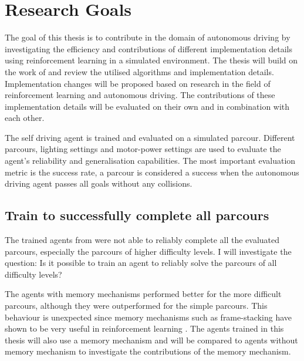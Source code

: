 


\chapter{Research Goals}
\label{cha:Research Goals}

The goal of this thesis is to contribute in the domain of autonomous driving by investigating the efficiency and contributions of different implementation details using reinforcement learning in a simulated environment. The thesis will build on the work of \autocite{maximilian} and review the utilised algorithms and implementation details. Implementation changes will be proposed based on research in the field of reinforcement learning and autonomous driving. The contributions of these implementation details will be evaluated on their own and in combination with each other. 


The self driving agent is trained and evaluated on a simulated parcour. Different parcours, lighting settings and motor-power settings are used to evaluate the agent's reliability and generalisation capabilities. The most important evaluation metric is the success rate, a parcour is considered a success when the autonomous driving agent passes all goals without any collisions.

\section*{Train to successfully complete all parcours}

The trained agents from \autocite{maximilian} were not able to reliably complete all the evaluated parcours, especially the parcours of higher difficulty levels. I will investigate the question: Is it possible to train an agent to reliably solve the parcours of all difficulty levels?

The agents \autocite{maximilian} with memory mechanisms performed better for the more difficult parcours, although they were outperformed for the simple parcours. This behaviour is unexpected since memory mechanisms such as frame-stacking have shown to be very useful in reinforcement learning \autocite{human_level_control}. The agents trained in this thesis will also use a memory mechanism and will be compared to agents without memory mechanism to investigate the contributions of the memory mechanism.


